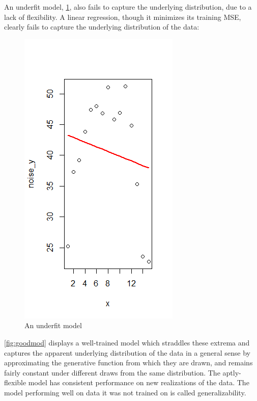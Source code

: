 \documentclass[12pt,twoside]{reedthesis}
\begin{document}
An underfit model, \ref{fig:underfit}, also fails to capture the
underlying distribution, due to a lack of flexibility. A linear
regression, though it minimizes its training MSE, clearly fails to
capture the underlying distribution of the data:
\begin{figure}
\centering
\includegraphics{figure/underfit.png}
\caption{\label{fig:underfit}An underfit model}
\end{figure}
\ref{fig:goodmod} displays a well-trained model which straddles these
extrema and captures the apparent underlying distribution of the data in
a general sense by approximating the generative function from which they
are drawn, and remains fairly constant under different draws from the
same distribution. The aptly-flexible model has consistent performance
on new realizations of the data. The model performing well on data it
was not trained on is called generalizability.
\end{document}
